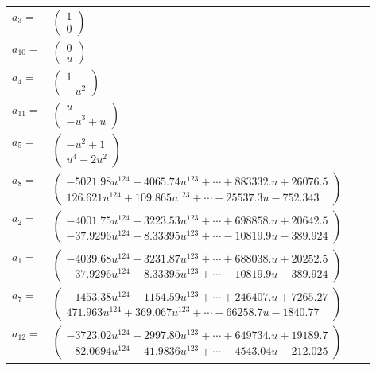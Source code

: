\documentclass[1p]{elsarticle_modified}
\theoremstyle{definition}
\begin{document}
\begin{tabular}{m{7pt} m{180pt} m{7pt} m{180pt} }
\flushright $a_{3}=$&$\begin{pmatrix}1\\0\end{pmatrix}$ \\
\flushright $a_{10}=$&$\begin{pmatrix}0\\u\end{pmatrix}$ \\
\flushright $a_{4}=$&$\begin{pmatrix}1\\- u^2\end{pmatrix}$ \\
\flushright $a_{11}=$&$\begin{pmatrix}u\\- u^3+u\end{pmatrix}$ \\
\flushright $a_{5}=$&$\begin{pmatrix}- u^2+1\\u^4-2 u^2\end{pmatrix}$ \\
\flushright $a_{8}=$&$\begin{pmatrix}-5021.98 u^{124}-4065.74 u^{123}+\cdots+883332. u+26076.5\\126.621 u^{124}+109.865 u^{123}+\cdots-25537.3 u-752.343\end{pmatrix}$ \\
\flushright $a_{2}=$&$\begin{pmatrix}-4001.75 u^{124}-3223.53 u^{123}+\cdots+698858. u+20642.5\\-37.9296 u^{124}-8.33395 u^{123}+\cdots-10819.9 u-389.924\end{pmatrix}$ \\
\flushright $a_{1}=$&$\begin{pmatrix}-4039.68 u^{124}-3231.87 u^{123}+\cdots+688038. u+20252.5\\-37.9296 u^{124}-8.33395 u^{123}+\cdots-10819.9 u-389.924\end{pmatrix}$ \\
\flushright $a_{7}=$&$\begin{pmatrix}-1453.38 u^{124}-1154.59 u^{123}+\cdots+246407. u+7265.27\\471.963 u^{124}+369.067 u^{123}+\cdots-66258.7 u-1840.77\end{pmatrix}$ \\
\flushright $a_{12}=$&$\begin{pmatrix}-3723.02 u^{124}-2997.80 u^{123}+\cdots+649734. u+19189.7\\-82.0694 u^{124}-41.9836 u^{123}+\cdots-4543.04 u-212.025\end{pmatrix}$ \\

\end{tabular}
\end{document}

